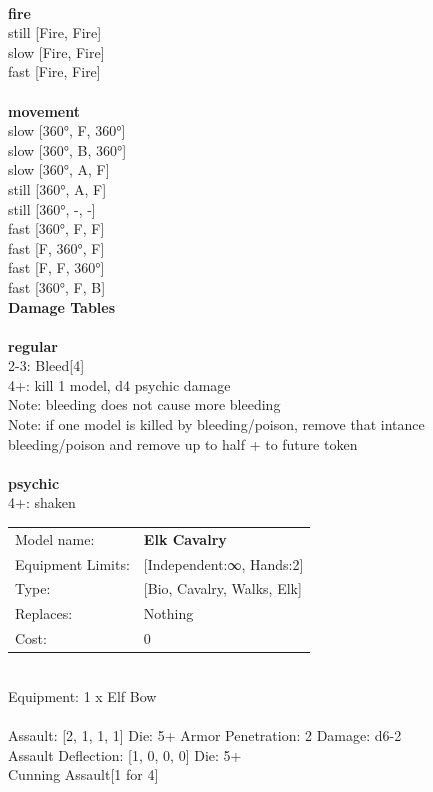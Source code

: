 \ \\ {\bf fire } \\
still [Fire, Fire] \\
slow [Fire, Fire] \\
fast [Fire, Fire] \\
\ \\ {\bf movement } \\
slow [360°, F, 360°] \\
slow [360°, B, 360°] \\
slow [360°, A, F] \\
still [360°, A, F] \\
still [360°, -, -] \\
fast [360°, F, F] \\
fast [F, 360°, F] \\
fast [F, F, 360°] \\
fast [360°, F, B] \\


{\bf Damage Tables} \\
\ \\ {\bf regular } \\
2-3: Bleed[4] \\
4+: kill 1 model, d4 psychic damage \\
Note: bleeding does not cause more bleeding \\
Note: if one model is killed by bleeding/poison, remove that intance \\ bleeding/poison and remove up to half + to future token \\
\ \\ {\bf psychic } \\
4+: shaken \\


\noindent
\begin{tabular}{ll}
Model name: &{\bf Elk Cavalry } \\
Equipment Limits: &[Independent:∞, Hands:2] \\
Type: &[Bio, Cavalry, Walks, Elk] \\
Replaces: &Nothing \\
Cost: & 0\\
\end{tabular}
\ \\
Equipment: 1 x Elf Bow \\
\ \\
Assault: [2, 1, 1, 1] Die: 5+ Armor Penetration: 2 Damage: d6-2 \\
Assault Deflection: [1, 0, 0, 0] Die: 5+\\
\indent Cunning Assault[1 for 4]\\ 
 
